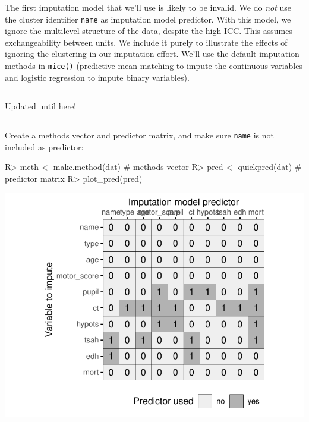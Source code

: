 \documentclass[
]{jss}
\begin{document}
The first imputation model that we'll use is likely to be invalid. We do
\emph{not} use the cluster identifier \texttt{name} as imputation model
predictor. With this model, we ignore the multilevel structure of the
data, despite the high ICC. This assumes exchangeability between units.
We include it purely to illustrate the effects of ignoring the
clustering in our imputation effort. We'll use the default imputation
methods in \texttt{mice()} (predictive mean matching to impute the
continuous variables and logistic regression to impute binary
variables).

\begin{center}\rule{0.5\linewidth}{0.5pt}\end{center}

\begin{center}

Updated until here!

\end{center}

\begin{center}\rule{0.5\linewidth}{0.5pt}\end{center}

Create a methods vector and predictor matrix, and make sure
\texttt{name} is not included as predictor:

\begin{CodeChunk}
\begin{CodeInput}
R> meth <- make.method(dat) # methods vector
R> pred <- quickpred(dat)   # predictor matrix
R> plot_pred(pred)
\end{CodeInput}


\begin{center}\includegraphics{Imputation_of_Incomplete_Multilevel_Data_files/figure-latex/ignore-1} \end{center}

\end{CodeChunk}
\end{document}
